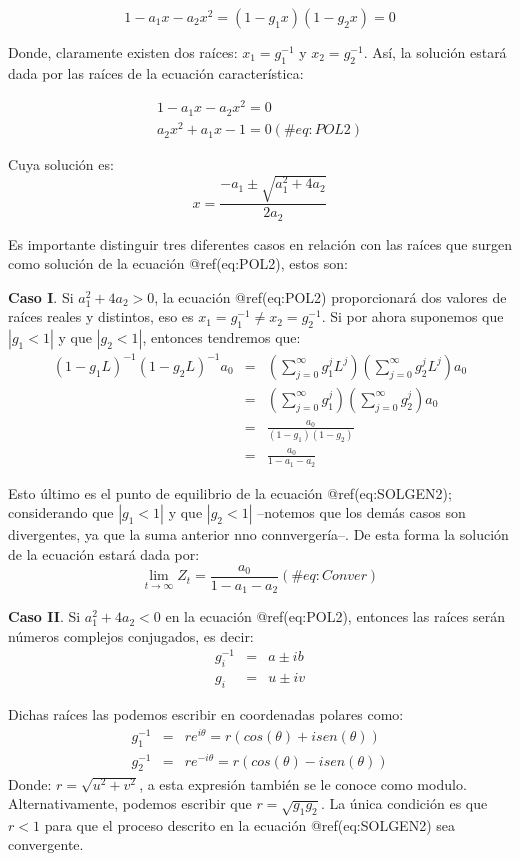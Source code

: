 \documentclass[
  a4paper,
]{article}
\begin{document}
\[
    1 - a_1 x - a_2 x^2 = (1 - g_1 x)(1 - g_2 x) = 0
\]

Donde, claramente existen dos raíces: \(x_1 = g^{-1}_1\) y
\(x_2 = g^{-1}_2\). Así, la solución estará dada por las raíces de la
ecuación característica:

\begin{eqnarray}
    1 - a_1 x - a_2 x^2 = 0 \nonumber \\
    a_2 x^2 + a_1 x - 1 = 0
    (\#eq:POL2)
\end{eqnarray}

Cuya solución es: \[
    x = \frac{- a_1 \pm \sqrt{a^2_1 + 4 a_2}}{2 a_2}
\]

Es importante distinguir tres diferentes casos en relación con las
raíces que surgen como solución de la ecuación @ref(eq:POL2), estos son:

\textbf{Caso I}. Si \(a^2_1 + 4 a_2 > 0\), la ecuación @ref(eq:POL2)
proporcionará dos valores de raíces reales y distintos, eso es
\(x_1 = g^{-1}_1 \neq x_2 = g^{-1}_2\). Si por ahora suponemos que
\(|{g_1} < 1|\) y que \(|{g_2} < 1|\), entonces tendremos que:
\begin{eqnarray}
    (1 - g_1 L)^{-1} (1 - g_2 L)^{-1} a_0 & =&  \left( \sum^{\infty}_{j = 0}{g^j_1 L^j} \right) \left( \sum^{\infty}_{j = 0}{g^j_2 L^j} \right) a_0 \nonumber \\
    & = & \left( \sum^{\infty}_{j = 0}{g^j_1} \right) \left( \sum^{\infty}_{j = 0}{g^j_2} \right) a_0 \nonumber \\
    & = & \frac{a_0}{(1 - g_1)(1 - g_2)} \nonumber \\
    & = & \frac{a_0}{1 - a_1 - a_2}
\end{eqnarray}

Esto último es el punto de equilibrio de la ecuación @ref(eq:SOLGEN2);
considerando que \(|{g_1} < 1|\) y que \(|{g_2} < 1|\) --notemos que los
demás casos son divergentes, ya que la suma anterior nno connvergería--.
De esta forma la solución de la ecuación estará dada por: \[
    \lim_{t \to \infty} Z_t = \frac{a_0}{1 - a_1 - a_2}
    (\#eq:Conver)
\]

\textbf{Caso II}. Si \(a_1^2 + 4a_2 < 0\) en la ecuación @ref(eq:POL2),
entonces las raíces serán números complejos conjugados, es decir:
\begin{eqnarray}
    g_i^{-1} & = & a \pm ib \\
    g_i & = & u \pm iv 
\end{eqnarray}

Dichas raíces las podemos escribir en coordenadas polares como:
\begin{eqnarray}
    g_1^{-1} & = & r e^{i \theta} = r (cos(\theta) + i sen(\theta)) \\
    g_2^{-1} & = & r e^{-i \theta} = r (cos(\theta) - i sen(\theta))
\end{eqnarray} Donde: \(r = \sqrt{u^2 + v^2}\), a esta expresión también
se le conoce como modulo. Alternativamente, podemos escribir que
\(r = \sqrt{g_1 g_2}\). La única condición es que \(r < 1\) para que el
proceso descrito en la ecuación @ref(eq:SOLGEN2) sea convergente.
\end{document}
